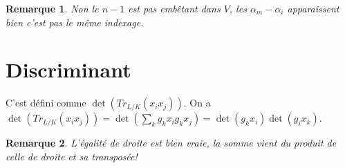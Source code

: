 \documentclass[a4paper,12pt]{book}
\theoremstyle{plain}
\newtheorem{rem}{Remarque}
\theoremstyle{definition}
\theoremstyle{remark}
\begin{document}
\begin{rem}
    Non le $n-1$ est pas embêtant dans $V$, les $\alpha_m-\alpha_i$ 
    apparaissent bien c'est pas le même indexage.
\end{rem}

\section{Discriminant}
C'est défini comme $\det(Tr_{L/K}(x_ix_j))$. On a
$\det(Tr_{L/K}(x_ix_j))=\det(\sum_{k} g_kx_ig_kx_j)=\det(g_kx_i)\det(g_ix_k)$.
\begin{rem}
    L'égalité de droite est bien vraie, la somme vient du produit de celle
    de droite et sa transposée!
\end{rem}
\end{document}
